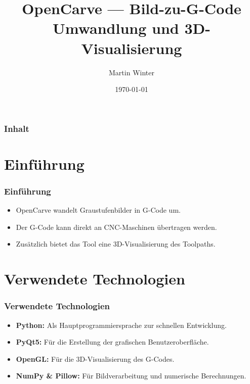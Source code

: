 \documentclass[14pt, aspectratio=169]{beamer}
\title{OpenCarve --- Bild-zu-G-Code Umwandlung und 3D-Visualisierung}
\author{Martin Winter}
\institute{3D-Prototyping}
\date{\today}
\begin{document}
\frame{\titlepage}

\begin{frame}
  \frametitle{Inhalt}
  \tableofcontents
\end{frame}

\section{Einführung}
\begin{frame}
  \frametitle{Einführung}
  \begin{itemize}
    \item OpenCarve wandelt Graustufenbilder in G-Code um.
    \item Der G-Code kann direkt an CNC-Maschinen übertragen werden.
    \item Zusätzlich bietet das Tool eine 3D-Visualisierung des Toolpaths.
  \end{itemize}
\end{frame}

\section{Verwendete Technologien}
\begin{frame}
  \frametitle{Verwendete Technologien}
  \begin{itemize}
    \item \textbf{Python:} Als Hauptprogrammiersprache zur schnellen Entwicklung.
    \item \textbf{PyQt5:} Für die Erstellung der grafischen Benutzeroberfläche.
    \item \textbf{OpenGL:} Für die 3D-Visualisierung des G-Codes.
    \item \textbf{NumPy \& Pillow:} Für Bildverarbeitung und numerische Berechnungen.
  \end{itemize}
\end{frame}
\end{document}
